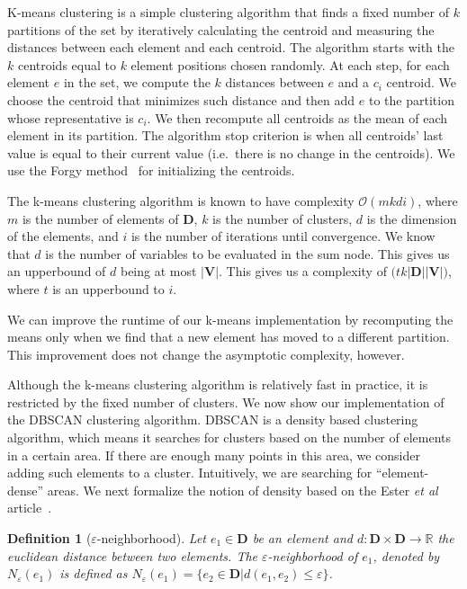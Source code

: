 \documentclass{amsart}
\theoremstyle{plain}
\newcounter{dummy-def}\numberwithin{dummy-def}{section}
\newtheorem{definition}[dummy-def]{Definition}
\newcounter{dummy-thm}\numberwithin{dummy-thm}{section}
\newcounter{dummy-prop}\numberwithin{dummy-prop}{section}
\newcounter{dummy-corollary}\numberwithin{dummy-corollary}{section}
\newcounter{dummy-lemma}\numberwithin{dummy-lemma}{section}
\newcounter{dummy-ex}\numberwithin{dummy-ex}{section}
\newcounter{dummy-eg}\numberwithin{dummy-eg}{section}
\numberwithin{equation}{section}
\newcommand{\set}[1]{\mathbf{#1}}
\newcommand{\eps}{\varepsilon}
\newcommand{\bigo}{\mathcal{O}}
\begin{document}
K-means clustering is a simple clustering algorithm that finds a fixed number of $k$ partitions of
the set by iteratively calculating the centroid and measuring the distances between each element
and each centroid. The algorithm starts with the $k$ centroids equal to $k$ element positions
chosen randomly. At each step, for each element $e$ in the set, we compute the $k$ distances
between $e$ and a $c_i$ centroid. We choose the centroid that minimizes such distance and then add
$e$ to the partition whose representative is $c_i$. We then recompute all centroids as the mean of
each element in its partition. The algorithm stop criterion is when all centroids' last value is
equal to their current value (i.e.\ there is no change in the centroids). We use the Forgy
method~\cite{forgy} for initializing the centroids.


The k-means clustering algorithm is known to have complexity $\bigo(mkdi)$, where $m$ is the number
of elements of $\set{D}$, $k$ is the number of clusters, $d$ is the dimension of the elements, and
$i$ is the number of iterations until convergence. We know that $d$ is the number of variables to
be evaluated in the sum node. This gives us an upperbound of $d$ being at most $|\set{V}|$. This
gives us a complexity of $\big(tk |\set{D}| |\set{V}|)$, where $t$ is an upperbound to $i$.

We can improve the runtime of our k-means implementation by recomputing the means only when we find
that a new element has moved to a different partition. This improvement does not change the
asymptotic complexity, however.

Although the k-means clustering algorithm is relatively fast in practice, it is restricted by the
fixed number of clusters. We now show our implementation of the DBSCAN clustering algorithm. DBSCAN
is a density based clustering algorithm, which means it searches for clusters based on the number
of elements in a certain area. If there are enough many points in this area, we consider adding
such elements to a cluster. Intuitively, we are searching for ``element-dense'' areas. We next
formalize the notion of density based on the Ester \textit{et al} article~\cite{dbscan}.

\begin{definition}[$\eps$-neighborhood]
  Let $e_1\in\set{D}$ be an element and $d:\set{D}\times\set{D}\to \mathbb{R}$ the euclidean
  distance between two elements. The $\eps$-neighborhood of $e_1$, denoted by
  $N_\eps(e_1)$ is defined as $N_\eps(e_1)=\{e_2\in\set{D}|d(e_1,
  e_2)\leq\eps\}$.
\end{definition}
\end{document}
